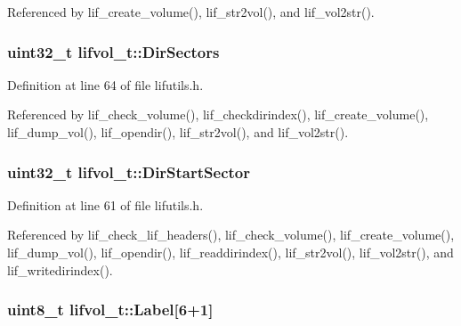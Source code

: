 Referenced by lif\+\_\+create\+\_\+volume(), lif\+\_\+str2vol(), and lif\+\_\+vol2str().

\subsubsection[{\texorpdfstring{Dir\+Sectors}{DirSectors}}]{\setlength{\rightskip}{0pt plus 5cm}uint32\+\_\+t lifvol\+\_\+t\+::\+Dir\+Sectors}\hypertarget{structlifvol__t_aceac3bc67cda1f79d91c002411e33897}{}\label{structlifvol__t_aceac3bc67cda1f79d91c002411e33897}


Definition at line 64 of file lifutils.\+h.



Referenced by lif\+\_\+check\+\_\+volume(), lif\+\_\+checkdirindex(), lif\+\_\+create\+\_\+volume(), lif\+\_\+dump\+\_\+vol(), lif\+\_\+opendir(), lif\+\_\+str2vol(), and lif\+\_\+vol2str().

\subsubsection[{\texorpdfstring{Dir\+Start\+Sector}{DirStartSector}}]{\setlength{\rightskip}{0pt plus 5cm}uint32\+\_\+t lifvol\+\_\+t\+::\+Dir\+Start\+Sector}\hypertarget{structlifvol__t_a89b86c990a7843cfa2addfff9a775137}{}\label{structlifvol__t_a89b86c990a7843cfa2addfff9a775137}


Definition at line 61 of file lifutils.\+h.



Referenced by lif\+\_\+check\+\_\+lif\+\_\+headers(), lif\+\_\+check\+\_\+volume(), lif\+\_\+create\+\_\+volume(), lif\+\_\+dump\+\_\+vol(), lif\+\_\+opendir(), lif\+\_\+readdirindex(), lif\+\_\+str2vol(), lif\+\_\+vol2str(), and lif\+\_\+writedirindex().

\subsubsection[{\texorpdfstring{Label}{Label}}]{\setlength{\rightskip}{0pt plus 5cm}uint8\+\_\+t lifvol\+\_\+t\+::\+Label\mbox{[}6+1\mbox{]}}\hypertarget{structlifvol__t_abbccb2f637812a31d24aa1f6725194be}{}\label{structlifvol__t_abbccb2f637812a31d24aa1f6725194be}


